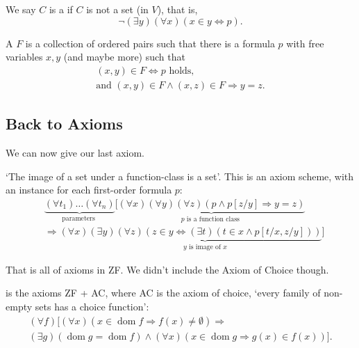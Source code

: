 \documentclass[a4paper, 10pt, twocolumn]{amsart}
\begin{document}
\begin{definition}
  We say $C$ is a  if $C$ is not a set (in $V$), that is,
  $$
\lnot (\exists y)(\forall x)(x \in y \Leftrightarrow p).
  $$
\end{definition}
\begin{definition}
  A  $F$ is a collection of ordered pairs such that there is a formula $p$ with free variables $x, y$ (and maybe more) such that
  \begin{align*}
(x, y) \in F \Leftrightarrow p\text{ holds},\\ \text{and }(x, y) \in F \land (x, z) \in F \Rightarrow y = z.
  \end{align*}
\end{definition}

\subsection{Back to Axioms}

We can now give our last axiom.

\begin{axiom}
  `The image of a set under a function-class is a set'. This is an axiom scheme,
  with an instance for each first-order formula $p$:
  {\small
  \begin{align*}
      & \underbrace{\left(\forall t_1\right) \ldots\left(\forall t_n\right)}_{\text {parameters }}[\underbrace{(\forall x)(\forall y)(\forall z)(p \land p[z / y] \Rightarrow y=z)}_{p \text { is a function class }} \\
      & \Rightarrow (\forall x) \underbrace{(\exists y)(\forall z)(z \in y \Leftrightarrow(\exists t)(t \in x \land p[t / x , z / y]))}_{y \text { is image of } x}]
  \end{align*}
  }
\end{axiom}

That is all of axioms in ZF. We didn't include the Axiom of Choice though.

\begin{definition}[ZFC]
   is the axioms ZF + AC, where AC is the axiom of choice, `every family of non-empty sets has a choice function':
  {\small\begin{align*}
    (\forall f)[(\forall x)(x \in \operatorname{dom} f \Rightarrow f(x) \neq \emptyset) \Rightarrow \\
    (\exists g)(\operatorname{dom} g = \operatorname{dom} f) \land (\forall x)(x \in \operatorname{dom}g \Rightarrow g(x) \in f(x))].
  \end{align*}}
\end{definition}
\end{document}

